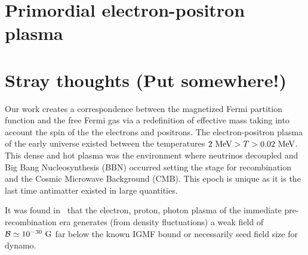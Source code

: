 \documentclass[a4paper]{article}
\begin{document}
\section{Primordial electron-positron plasma}\label{sec:ElectronPositron}
\section{Stray thoughts (Put somewhere!)}

Our work creates a correspondence between the magnetized Fermi partition function and the free Fermi gas via a redefinition of effective mass taking into account the spin of the the electrons and positrons. The electron-positron plasma of the early universe existed between the temperatures $2\text{ MeV}>T>0.02\text{ MeV}$.  This dense and hot plasma was the environment where neutrinos decoupled and Big Bang Nucleosynthesis (BBN) occurred setting the stage for recombination and the Cosmic Microwave Background (CMB). This epoch is unique as it is the last time antimatter existed in large quantities.

It was found in~\cite{gopal2004generation} that the electron, proton, photon plasma of the immediate pre-recombination era generates (from density fluctuations) a weak field of ${\cal B}\simeq10^{-30}{\rm\ G}$ far below the known IGMF bound or necessarily seed field size for dynamo.




\end{document}
